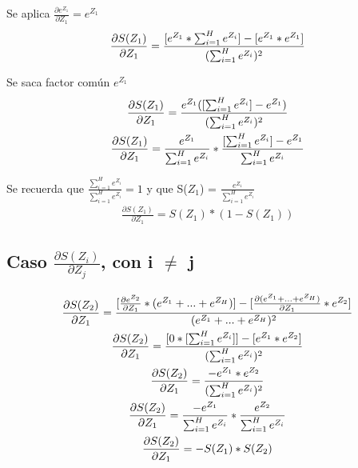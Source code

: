 Se aplica $\frac{\partial e^{Z_1}}{\partial Z_1} = e^{Z_1}$ \\
\begin{gather}
	\frac{\partial S(Z_1)}{\partial Z_1} = \frac{[e^{Z_1} * \sum_{i=1}^{H}  e^{Z_i}] - [e^{Z_1} * e^{Z_1}]   }{ (\sum_{i=1}^{H}  e^{Z_i})^2} \notag \\
\end{gather}

Se saca factor común $e^{Z_1}$ \\
\begin{gather}
	\frac{\partial S(Z_1)}{\partial Z_1} = \frac{e^{Z_1} ([\sum_{i=1}^{H}  e^{Z_i}] - e^{Z_1})  }{(\sum_{i=1}^{H}  e^{Z_i})^2} \notag \\
	\frac{\partial S(Z_1)}{\partial Z_1} = \frac{e^{Z_1}}{\sum_{i=1}^{H}  e^{Z_i}} * \frac{[\sum_{i=1}^{H}  e^{Z_i}] - e^{Z_1}}{\sum_{i=1}^{H}  e^{Z_i}} \notag
\end{gather}

Se recuerda que $\frac{\sum_{i=1}^{H}  e^{Z_i}}{\sum_{i=1}^{H}  e^{Z_i}} = 1$ y que S($Z_1$) = $ \frac{e^{Z_1}}{\sum_{i=1}^{H}  e^{Z_i}}$ \\
\begin{gather}
	\frac{\partial S(Z_1)}{\partial Z_1} = S(Z_1) * (1- S(Z_1))
	\label{grad_Oi_Zk_drch}
\end{gather}

\subsection{Caso $\frac{\partial S(Z_i)}{\partial Z_j}$, con i $\neq$ j}

\begin{gather}
	\frac{\partial S(Z_2)}{\partial Z_1} = \frac{[\frac{\partial e^{Z_2}}{\partial Z_1} * (e^{Z_1} + ... + e^{Z_H}) ] - [\frac{\partial (e^{Z_1} + ... + e^{Z_H})}{\partial Z_1} * e^{Z_2} ] }{(e^{Z_1} + ... + e^{Z_H})^2} \notag \\
	\frac{\partial S(Z_2)}{\partial Z_1} = \frac{[0 * [\sum_{i=1}^{H}  e^{Z_i}]] - [e^{Z_1} * e^{Z_2}]   }{ (\sum_{i=1}^{H}  e^{Z_i})^2} \notag \\
	\frac{\partial S(Z_2)}{\partial Z_1} = \frac{-e^{Z_1} * e^{Z_2}  }{(\sum_{i=1}^{H}  e^{Z_i})^2} \notag \\
	\frac{\partial S(Z_2)}{\partial Z_1} = \frac{-e^{Z_1}}{\sum_{i=1}^{H}  e^{Z_i}} * \frac{e^{Z_2}}{\sum_{i=1}^{H}  e^{Z_i}} \notag \\
	\frac{\partial S(Z_2)}{\partial Z_1} = -S(Z_1) * S(Z_2)
	\label{grad_Oi_Zk_izq}
\end{gather}

